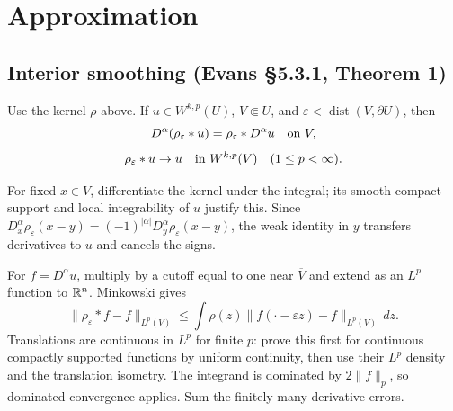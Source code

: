 \section{Approximation}
\label{sec:5-3}

\subsection{Interior smoothing (Evans \S5.3.1, Theorem 1)}
Use the kernel $\rho$ above. If $u\in W^{k,p}(U)$, $V\Subset U$, and
$\varepsilon<\operatorname{dist}(V,\partial U)$, then
\[
 D^\alpha(\rho_\varepsilon*u)=\rho_\varepsilon*D^\alpha u
 \quad\hbox{on }V,
\]
\[
 \rho_\varepsilon*u\to u\quad\hbox{in }W^{k,p}(V)
 \quad (1\leq p<\infty).
\]
\Needspace{45mm}
\begin{expandedproof}
For fixed $x\in V$, differentiate the kernel under the integral; its
smooth compact support and local integrability of $u$ justify this.
Since $D_x^\alpha\rho_\varepsilon(x-y)=
(-1)^{|\alpha|}D_y^\alpha\rho_\varepsilon(x-y)$, the weak identity in
$y$ transfers derivatives to $u$ and cancels the signs.

For $f=D^\alpha u$, multiply by a cutoff equal to one near $\overline V$
and extend as an $L^p$ function to $\mathbb{R}^n$. Minkowski gives
\[
 \|\rho_\varepsilon*f-f\|_{L^p(V)}
 \leq\int\rho(z)\|f(\cdot-\varepsilon z)-f\|_{L^p(V)}\,dz.
\]
Translations are continuous in $L^p$ for finite $p$: prove this first
for continuous compactly supported functions by uniform continuity,
then use their $L^p$ density and the translation isometry.
The integrand is dominated by $2\|f\|_p$, so dominated convergence applies.
Sum the finitely many derivative errors.
\end{expandedproof}

